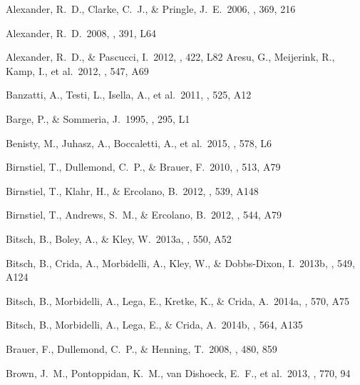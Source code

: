 \clearpage
\begin{thebibliography}{2000b}

 Alexander, R.~D., 
Clarke, C.~J., \& Pringle, J.~E.\ 2006, \mnras, 369, 216 

 Alexander, R.~D.\ 2008, 
\mnras, 391, L64 

 Alexander, R.~D., \& Pascucci, I.\ 2012, \mnras, 422, L82 
 Aresu, G., Meijerink, R., Kamp, I., et al.\ 2012, \aap, 547, A69 

 Banzatti, A., Testi, L., Isella, A., et al.\ 2011, \aap, 525, A12

 Barge, P., \& Sommeria, J.\ 1995, \aap, 295, L1 

 Benisty, M., Juhasz, A., Boccaletti, A., et al.\ 2015, \aap, 578, L6

 Birnstiel, T., Dullemond, C.~P., \& Brauer, F.\ 2010, \aap, 513, A79 

 Birnstiel, T., Klahr, H., \& Ercolano, B.\ 2012, \aap, 539, A148 

 Birnstiel, T., Andrews, S.~M., \& Ercolano, B.\ 2012, \aap, 544, A79

 Bitsch, B., Boley,
  A., \& Kley, W.\ 2013a, \aap, 550, A52

 Bitsch, B., Crida, A., Morbidelli, A., Kley, W., \& Dobbs-Dixon, I.\ 2013b, \aap, 549, A124

 Bitsch, B., Morbidelli, A., Lega, E., Kretke, K., \& Crida, A.\ 2014a, \aap, 570, A75

 Bitsch, B., Morbidelli, A., Lega, E., \& Crida, A.\ 2014b, \aap, 564, A135

 Brauer, F., Dullemond, C.~P., \& Henning, T.\ 2008, \aap, 480, 859 

 Brown, J.~M., Pontoppidan, K.~M., van Dishoeck, E.~F., et al.\ 2013, \apj, 770, 94


\end{thebibliography}
